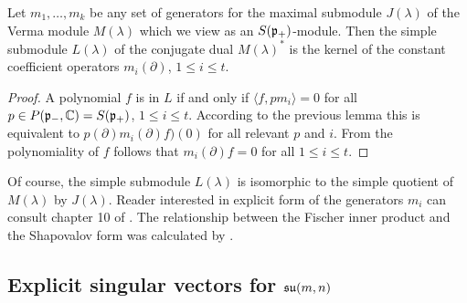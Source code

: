 \begin{theorem}
 Let $m_1,\ldots,m_k$ be any set of generators for the maximal submodule $J(\lambda)$ of the Verma module $M(\lambda)$ which we view as an $S(\mathfrak{p}_+)$-module. Then the simple submodule $L(\lambda)$ of the conjugate dual $M(\lambda)^*$ is the kernel of the constant coefficient operators $m_i(\partial)$, $1\leq i\leq t.$
\end{theorem}
\begin{proof}
 A polynomial $f$ is in $L$ if and only if $\langle f, p m_i \rangle = 0$ for all $p\in P(\mathfrak{p}_-,\mathbb{C}) = S(\mathfrak{p}_+)$, $1\leq i\leq t$. According to the previous lemma this is equivalent to $p(\partial)  m_i(\partial)f)(0)$ for all relevant $p$ and $i$. From the polynomiality of $f$ follows that $m_i(\partial)f = 0$ for all $1\leq i\leq t.$
\end{proof}

Of course, the simple submodule $L(\lambda)$ is isomorphic to the simple quotient of $M(\lambda)$ by $J(\lambda)$. Reader interested in explicit form of the generators $m_i$ can consult chapter 10 of \cite{davidson_differential_1991}. The relationship between the Fischer inner product and the Shapovalov form was calculated by \cite{wachi}.

\subsection[Explicit singular vectors for su(m, n)]{Explicit singular vectors for $\mathfrak{su}(m, n)$}

